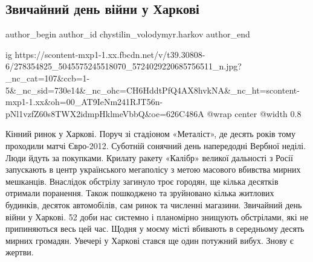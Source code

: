  
 
 
 
 
 
\subsection{Звичайний день війни у Харкові}
\label{sec:16_04_2022.fb.chystilin_volodymyr.harkov.1.den_vijny}
 
\ifcmt
 author_begin
   author_id chystilin_volodymyr.harkov
 author_end
\fi

\ifcmt
  ig https://scontent-mxp1-1.xx.fbcdn.net/v/t39.30808-6/278354825_5045575245518070_5724029220685756511_n.jpg?_nc_cat=107&ccb=1-5&_nc_sid=730e14&_nc_ohc=CH6HddtPfQ4AX8hvkNA&_nc_ht=scontent-mxp1-1.xx&oh=00_AT9IeNm241RJT56n-pNl1vzfZ60s8TWX2idmpHklmeVbbQ&oe=626C486A
  @wrap center
  @width 0.8
\fi

Кінний ринок у Харкові. Поруч зі стадіоном «Металіст», де десять років тому
проходили матчі Євро-2012. Суботній сонячний день напередодні Вербної неділі.
Люди йдуть за покупками. Крилату ракету «Калібр» великої дальності з Росії
запускають в центр українського мегаполісу з метою масового вбивства мирних
мешканців. Внаслідок обстрілу загинуло троє городян, ще кілька десятків
отримали поранення. Також пошкоджено та зруйновано кілька житлових будинків,
десяток автомобілів, сам ринок та численні магазини. Звичайний день війни у
Харкові. 52 доби нас системно і планомірно знищують обстрілами, які не
припиняються весь цей час. Щодня у моєму місті вбивають в середньому десять
мирних громадян. Увечері у Харкові стався ще один потужний вибух. Знову є
жертви.

